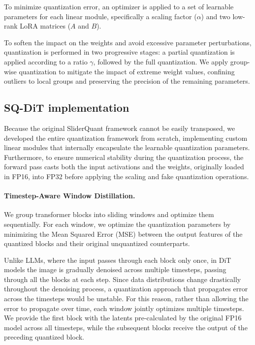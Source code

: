 \documentclass{article}
\begin{document}
To minimize quantization error, an optimizer is applied to a set of learnable parameters for each linear module, specifically a scaling factor ($\alpha$) and two low-rank LoRA matrices ($A$ and $B$).

To soften the impact on the weights and avoid excessive parameter perturbations, quantization is performed in two progressive stages: a partial quantization is applied according to a ratio $\gamma$, followed by the full quantization.
We apply group-wise quantization to mitigate the impact of extreme weight values, confining outliers to local groups and preserving the precision of the remaining parameters.


\subsection{SQ-DiT implementation}
Because the original SliderQuant framework cannot be easily transposed, we developed the entire quantization framework from scratch, implementing custom linear modules that internally encapsulate the learnable quantization parameters.
Furthermore, to ensure numerical stability during the quantization process, the forward pass casts both the input activations and the weights, originally loaded in FP16, into FP32 before applying the scaling and fake quantization operations.


\paragraph{Timestep-Aware Window Distillation.}

We group transformer blocks into sliding windows and optimize them sequentially.
For each window, we optimize the quantization parameters by minimizing the Mean Squared Error (MSE) between the output features of the quantized blocks and their original unquantized counterparts.

Unlike LLMs, where the input passes through each block only once, in DiT models the image is gradually denoised across multiple timesteps, passing through all the blocks at each step.
Since data distributions change drastically throughout the denoising process, a quantization approach that propagates error across the timesteps would be unstable.
For this reason, rather than allowing the error to propagate over time, each window jointly optimizes multiple timesteps.
We provide the first block with the latents pre-calculated by the original FP16 model across all timesteps, while the subsequent blocks receive the output of the preceding quantized block.
\end{document}
